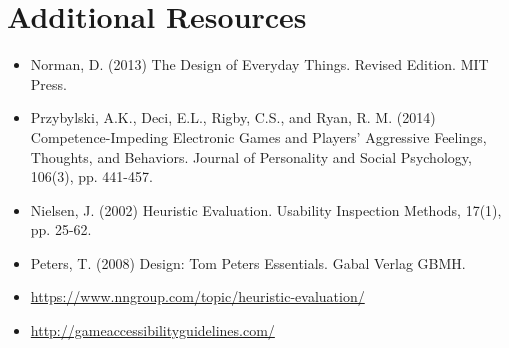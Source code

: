 \documentclass{../fal_assignment}
\begin{document}
\section*{Additional Resources}

\begin{itemize}
    \item Norman, D. (2013) The Design of Everyday Things. Revised Edition. MIT Press.
    \item Przybylski, A.K., Deci, E.L., Rigby, C.S., and Ryan, R. M. (2014) Competence-Impeding Electronic Games and Players' Aggressive Feelings, Thoughts, and Behaviors. Journal of Personality and Social Psychology, 106(3), pp. 441-457.
    \item Nielsen, J. (2002) Heuristic Evaluation. Usability Inspection Methods, 17(1), pp. 25-62. 
    \item Peters, T. (2008) Design: Tom Peters Essentials. Gabal Verlag GBMH.
    \item \url{https://www.nngroup.com/topic/heuristic-evaluation/}
    \item \url{http://gameaccessibilityguidelines.com/}
\end{itemize}
\end{document}
